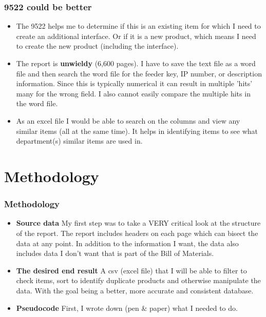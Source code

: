 \documentclass{beamer}\usepackage[]{graphicx}\usepackage[]{color}
\begin{document}
\begin{frame}[fragile]
  \frametitle{9522 could be better}
  \begin{itemize}  
\item<1->
    The 9522 helps me to determine if this is an existing item for which I need to create an additional interface. Or if it is a new product, which means I need to create the new product (including the interface).
\item<2->
    The report is \textbf{unwieldy} (6,600 pages).  I have to save the text file as a word file and then search the word file for the feeder key, IP number, or description information.  Since this is typically numerical it can result in multiple 'hits' many for the wrong field.  I also cannot easily compare the multiple hits in the word file. 
\item<3->
As an excel file I would be able to search on the columns and view any similar items (all at the same time).  It helps in identifying items to see what department(s) similar items are used in.  

\end{itemize}
  
\end{frame}

\section{Methodology}
\begin{frame}[fragile]
  \frametitle{Methodology}
\begin{itemize}  
\item<1->
\textbf{Source data}
My first step was to take a VERY critical look at the structure of the report.
The report includes headers on each page which can bisect the data at any point.  In addition to the information I want, the data also includes data I don't want that is part of the Bill of Materials.
\item<2-> 
\textbf{The desired end result}
A csv (excel file) that I will be able to filter to check items, sort to identify duplicate products and otherwise manipulate the data. With the goal being a better, more accurate and consistent database.
\item<3-> 
\textbf{Pseudocode}
First, I wrote down (pen & paper) what I needed to do.

\end{itemize}

\end{frame}
\end{document}
